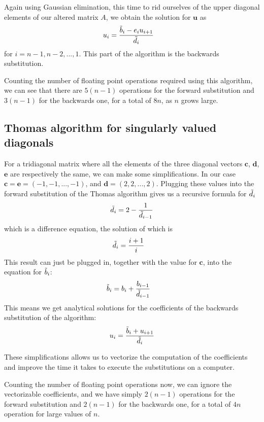 \documentclass[english]{article}
\renewcommand{\vec}{\mathbf} %
\begin{document}
Again using Gaussian elimination, this time to rid ourselves of the upper diagonal elements of our altered matrix $A$, we obtain the solution for $\vec{u}$ as
\begin{align*}
    u_i &= \frac{\Tilde{b}_i - e_i u_{i+1}}{\Tilde{d}_i}
\end{align*}
for $i = n-1, n-2, ..., 1$. This part of the algorithm is the backwards substitution.

Counting the number of floating point operations required using this algorithm, we can see that there are $5(n-1)$ operations for the forward substitution and $3(n-1)$ for the backwards one, for a total of $8n$, as $n$ grows large.



\subsection{Thomas algorithm for singularly valued diagonals}
For a tridiagonal matrix where all the elements of the three diagonal vectors $\vec{c}$, $\vec{d}$, $\vec{e}$ are respectively the same, we can make some simplifications. In our case $\vec{c} = \vec{e} = (-1, -1, ..., -1)$, and $\vec{d} = (2, 2, ..., 2)$. Plugging these values into the forward substitution of the Thomas algorithm gives us a recursive formula for $\Tilde{d}_i$
\begin{align*}
    \Tilde{d}_i = 2 - \frac{1}{\Tilde{d}_{i-1}}
\end{align*}
which is a difference equation, the solution of which is
\begin{align*}
    \Tilde{d}_i &= \frac{i+1}{i}
\end{align*}
This result can just be plugged in, together with the value for $\vec{c}$, into the equation for $\Tilde{b}_i$:
\begin{align*}
    \Tilde{b}_i &= b_i + \frac{b_{i-1}}{\Tilde{d}_{i-1}}
\end{align*}
This means we get analytical solutions for the coefficients of the backwards substitution of the algorithm:
\begin{align*}
    u_i = \frac{\Tilde{b}_i + u_{i+1}}{\Tilde{d}_{i}}
\end{align*}

These simplifications allows us to vectorize the computation of the coefficients and improve the time it takes to execute the substitutions on a computer.

Counting the number of floating point operations now, we can ignore the vectorizable coefficients, and we have simply $2(n-1)$ operations for the forward substitution and $2(n-1)$ for the backwards one, for a total of $4n$ operation for large values of $n$.
\end{document}
